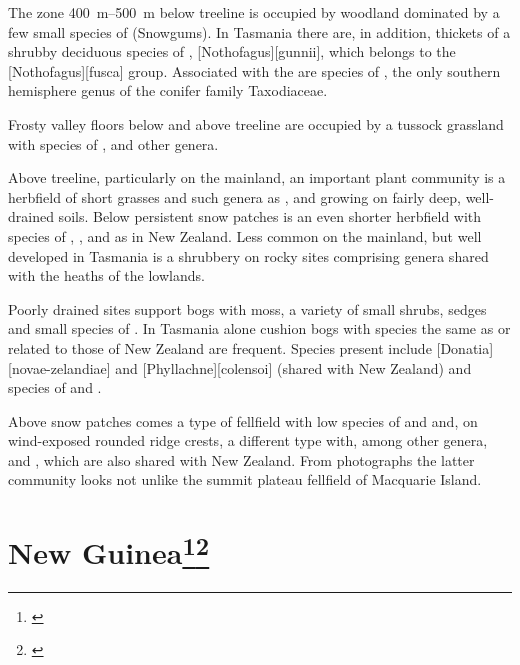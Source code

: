The zone \SIrange{400}{500}{\metre} below treeline is occupied by woodland dominated by a few small species of  (Snowgums).
In Tasmania there are, in addition, thickets of a shrubby deciduous species of , [Nothofagus][gunnii], which belongs to the [Nothofagus][fusca] group.
Associated with the  are species of , the only southern hemisphere genus of the conifer family Taxodiaceae.

Frosty valley floors below and above treeline are occupied by a tussock grassland with species of ,  and other genera.

Above treeline, particularly on the mainland, an important plant community is a herbfield of short grasses and such genera as ,  and  growing on fairly deep, well-drained soils.
Below persistent snow patches is an even shorter herbfield with species of , ,  and  as in New Zealand.
Less common on the mainland, but well developed in Tasmania is a shrubbery on rocky sites comprising genera shared with the heaths of the lowlands.

Poorly drained sites support bogs with  moss, a variety of small shrubs, sedges and small species of .
In Tasmania alone cushion bogs with species the same as or related to those of New Zealand are frequent.
Species present include [Donatia][novae-zelandiae] and [Phyllachne][colensoi] (shared with New Zealand) and species of  and .

Above snow patches comes a type of fellfield with low species of  and  and, on wind-exposed rounded ridge crests, a different type with, among other genera,  and , which are also shared with New Zealand.
From photographs the latter community looks not unlike the summit plateau fellfield of Macquarie Island.

\section[New Guinea]{New Guinea\thinspace\footnote{\cite{johns1982plant}}\footnote{\cite{wardle1973newguinea}}}

